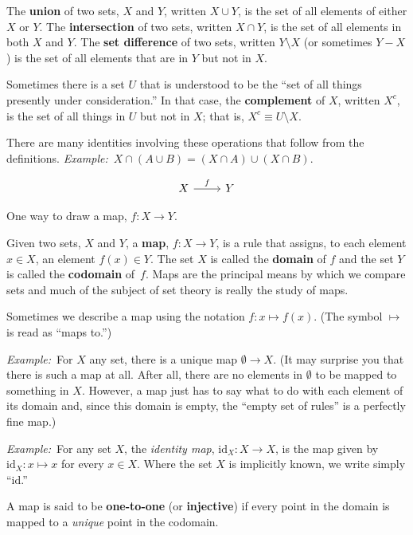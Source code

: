 \documentclass[12pt, a4paper]{article}
\newcommand{\defn}[1]{\textbf{#1}}
\newcommand{\eg}{\emph{Example:}\relax}
\newcommand{\id}{\text{id}}
\begin{document}
The \defn{union} of two sets, $X$ and $Y$, written $X \cup Y$, is the set
of all elements of either $X$ or $Y$. The \defn{intersection} of two
sets, written $X \cap Y$, is the set of all elements in both $X$ and
$Y$. The \defn{set difference} of two sets, written $Y \setminus X$ (or
sometimes $Y-X$) is the set of all elements that are in $Y$ but not in
$X$.

Sometimes there is a set $U$ that is understood to be the “set of all
things presently under consideration.” In that case, the
\defn{complement} of $X$, written $X^c$, is the set of all things in
$U$ but not in $X$; that is, $X^c \equiv U \setminus X$.

There are many identities involving these operations that follow from
the definitions.
\eg\ $X\cap(A\cup B) = (X\cap A) \cup (X\cap B)$.

\begin{sidefigure}
  \[\begin{tikzcd}
    X \arrow[r, "f"] & Y
  \end{tikzcd}\]
  \caption{One way to draw a map, $f\colon X\to Y$.}
\end{sidefigure}
Given two sets, $X$ and $Y$, a \defn{map}, $f\colon X \to Y$, is a rule
that assigns, to each element $x \in X$, an element $f(x) \in Y$. The set
$X$ is called the \defn{domain} of $f$ and the set $Y$ is called the
\defn{codomain} of~$f$. Maps are the principal means by which we compare
sets and much of the subject of set theory is really the study of
maps.

Sometimes we describe a map using the notation $f\colon x\mapsto f(x)$. (The
symbol $\mapsto$ is read as ``maps to.'')

\eg\ For $X$ any set, there is a unique map $\emptyset \to X$. (It may surprise
you that there is such a map at all. After all, there are no elements
in $\emptyset$ to be mapped to something in $X$. However, a map just has to
say what to do with each element of its domain and, since this domain
is empty, the “empty set of rules” is a perfectly fine map.)

\eg\ For any set $X$, the \emph{identity map}, $\id_X\colon X \to X$, is
the map given by $\id_X\colon x \mapsto x$ for every $x\in X$. Where the set
$X$ is implicitly known, we write simply “$\id$.”

A map is said to be \defn{one-to-one} (or \defn{injective}) if every
point in the domain is mapped to a \emph{unique} point in the
codomain.
\end{document}
